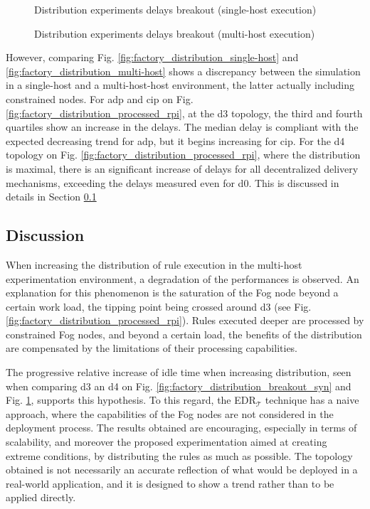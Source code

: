 \documentclass[sw]{iosart2x}
\newcommand{\edrt}{EDR$_{\mathcal{T}}$\xspace}
\begin{document}
\begin{figure}
	\Centering
	\caption{Distribution experiments delays breakout (single-host execution)}
	\label{fig:factory_distribution_breakout_syn}
	\scalebox{0.75}{
		
	}
	\caption{Distribution experiments delays breakout (multi-host execution)}
	\label{fig:factory_distribution_breakout_rpi}
	\scalebox{0.75}{
		
	}
\end{figure}

However, comparing Fig. \ref{fig:factory_distribution_single-host} and \ref{fig:factory_distribution_multi-host} shows a discrepancy between the simulation in a single-host and a multi-host-host environment, the latter actually including constrained nodes.
For \gls{adp} and \gls{cip} on Fig. \ref{fig:factory_distribution_processed_rpi}, at the d3 topology, the third and fourth quartiles show an increase in the delays.
The median delay is compliant with the expected decreasing trend for \gls{adp}, but it begins increasing for \gls{cip}.
For the d4 topology on Fig. \ref{fig:factory_distribution_processed_rpi}, where the distribution is maximal, there is an significant increase of delays for all decentralized delivery mechanisms, exceeding the delays measured even for d0.
This is discussed in details in Section \textsection \ref{subs:discussion}

\subsection{Discussion}
\label{subs:discussion}

When increasing the distribution of rule execution in the multi-host experimentation environment, a degradation of the performances is observed.
An explanation for this phenomenon is the saturation of the Fog node beyond a certain work load, the tipping point being crossed around d3 (see Fig. \ref{fig:factory_distribution_processed_rpi}). 
Rules executed deeper are processed by constrained Fog nodes, and beyond a certain load, the benefits of the distribution are compensated by the limitations of their processing capabilities.

The progressive relative increase of idle time when increasing distribution, seen when comparing d3 an d4 on Fig. \ref{fig:factory_distribution_breakout_syn} and Fig. \ref{fig:factory_distribution_breakout_rpi}, supports this hypothesis.
To this regard, the \edrt technique has a naive approach, where the capabilities of the Fog nodes are not considered in the deployment process.
The results obtained are encouraging, especially in terms of scalability, and moreover the proposed experimentation aimed at creating extreme conditions, by distributing the rules as much as possible.
The topology obtained is not necessarily an accurate reflection of what would be deployed in a real-world application, and it is designed to show a trend rather than to be applied directly.
\end{document}
